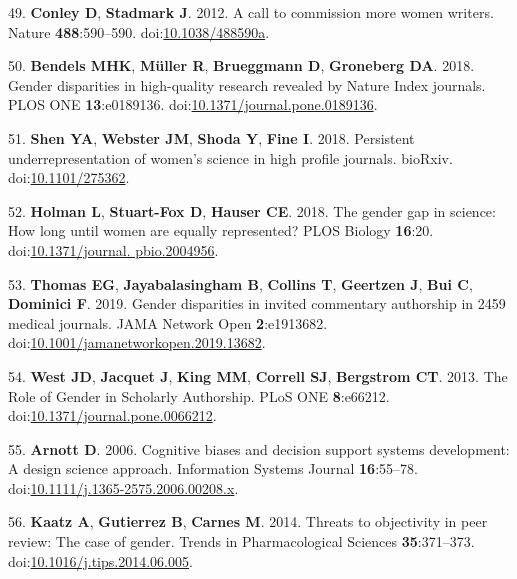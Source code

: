 \documentclass[11pt,]{article}
\begin{document}
\leavevmode\hypertarget{ref-conley_call_2012-1}{}%
49. \textbf{Conley D}, \textbf{Stadmark J}. 2012. A call to commission
more women writers. Nature \textbf{488}:590--590.
doi:\href{https://doi.org/10.1038/488590a}{10.1038/488590a}.

\leavevmode\hypertarget{ref-bendels_gender_2018}{}%
50. \textbf{Bendels MHK}, \textbf{Müller R}, \textbf{Brueggmann D},
\textbf{Groneberg DA}. 2018. Gender disparities in high-quality research
revealed by Nature Index journals. PLOS ONE \textbf{13}:e0189136.
doi:\href{https://doi.org/10.1371/journal.pone.0189136}{10.1371/journal.pone.0189136}.

\leavevmode\hypertarget{ref-Shen275362}{}%
51. \textbf{Shen YA}, \textbf{Webster JM}, \textbf{Shoda Y},
\textbf{Fine I}. 2018. Persistent underrepresentation of women's science
in high profile journals. bioRxiv.
doi:\href{https://doi.org/10.1101/275362}{10.1101/275362}.

\leavevmode\hypertarget{ref-holman_gender_2018}{}%
52. \textbf{Holman L}, \textbf{Stuart-Fox D}, \textbf{Hauser CE}. 2018.
The gender gap in science: How long until women are equally represented?
PLOS Biology \textbf{16}:20.
doi:\href{https://doi.org/10.1371/journal.\%20pbio.2004956}{10.1371/journal. pbio.2004956}.

\leavevmode\hypertarget{ref-Thomas2019}{}%
53. \textbf{Thomas EG}, \textbf{Jayabalasingham B}, \textbf{Collins T},
\textbf{Geertzen J}, \textbf{Bui C}, \textbf{Dominici F}. 2019. Gender
disparities in invited commentary authorship in 2459 medical journals.
JAMA Network Open \textbf{2}:e1913682.
doi:\href{https://doi.org/10.1001/jamanetworkopen.2019.13682}{10.1001/jamanetworkopen.2019.13682}.

\leavevmode\hypertarget{ref-west_role_2013}{}%
54. \textbf{West JD}, \textbf{Jacquet J}, \textbf{King MM},
\textbf{Correll SJ}, \textbf{Bergstrom CT}. 2013. The Role of Gender in
Scholarly Authorship. PLoS ONE \textbf{8}:e66212.
doi:\href{https://doi.org/10.1371/journal.pone.0066212}{10.1371/journal.pone.0066212}.

\leavevmode\hypertarget{ref-Arnott2006}{}%
55. \textbf{Arnott D}. 2006. Cognitive biases and decision support
systems development: A design science approach. Information Systems
Journal \textbf{16}:55--78.
doi:\href{https://doi.org/10.1111/j.1365-2575.2006.00208.x}{10.1111/j.1365-2575.2006.00208.x}.

\leavevmode\hypertarget{ref-Kaatz2014}{}%
56. \textbf{Kaatz A}, \textbf{Gutierrez B}, \textbf{Carnes M}. 2014.
Threats to objectivity in peer review: The case of gender. Trends in
Pharmacological Sciences \textbf{35}:371--373.
doi:\href{https://doi.org/10.1016/j.tips.2014.06.005}{10.1016/j.tips.2014.06.005}.
\end{document}
